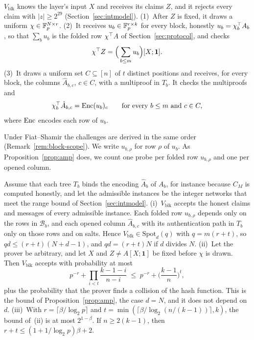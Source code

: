  $V_{\mathrm{blk}}$ knows the layer's input $X$ and receives its claims
$Z$, and it rejects every claim with $|z|\ge2^{29}$ (Section~\ref{sec:intmodel}).
(1)~After $Z$ is fixed, it draws a uniform $\chi\in\mathbb{F}_p^{N\times r}$.
(2)~It receives $u_b\in\mathbb{F}_p^{r\times k}$ for every block, honestly $u_b=\chi_b^\top A_b$, so that
$\sum_bu_b$ is the folded row $\chi^\top A$ of Section~\ref{sec:protocol}, and checks
\begin{equation}
  \chi^\top Z=\Big(\sum_{b\le m}u_b\Big)[X;\mathbf 1].
  \label{eq:block-freivalds}
\end{equation}
(3)~It draws a uniform set $C\subseteq[n]$ of $t$ distinct positions and receives, for every block,
the columns $\hat A_{b,c}$, $c\in C$, with a multiproof in $T_b$. It checks the multiproofs and
\begin{equation}
  \chi_b^\top\hat A_{b,c}=\mathrm{Enc}(u_b)_c\qquad\text{for every }b\le m\text{ and }c\in C,
  \label{eq:block-columns}
\end{equation}
where $\mathrm{Enc}$ encodes each row of $u_b$.

\noindent Under Fiat--Shamir the challenges are derived in the same order
(Remark~\ref{rem:block-scope}). We write $u_{b,\rho}$ for row $\rho$ of $u_b$. As
Proposition~\ref{prop:amp} does, we count one probe per folded row $u_{b,\rho}$ and one per opened
column.

\begin{proposition}
\label{prop:block}
Assume that each tree $T_b$ binds the encoding $\hat A_b$ of $A_b$, for instance because $C_M$ is
computed honestly, and let the admissible instances be the integer networks that meet the range
bound of Section~\ref{sec:intmodel}.
(i)~$V_{\mathrm{blk}}$ accepts the honest claims and messages of every admissible instance. Each
folded row $u_{b,\rho}$ depends only on the rows in $\mathcal B_b$, and each opened column
$\hat A_{b,c}$ with its authentication path in $T_b$ only on those rows and on salts. Hence
$V_{\mathrm{blk}}\in\mathrm{Spot}_d(q)$ with $q=m(r+t)$, so $qd\le(r+t)(N+d-1)$, and $qd=(r+t)N$ if
$d$ divides $N$.
(ii)~Let the prover be arbitrary, and let $X$ and $Z\neq A[X;\mathbf 1]$ be fixed before $\chi$ is
drawn. Then $V_{\mathrm{blk}}$ accepts with probability at most
\[
  p^{-r}+\prod_{i<t}\frac{k-1-i}{n-i}\;\le\;p^{-r}+\Big(\frac{k-1}{n}\Big)^{t},
\]
plus the probability that the prover finds a collision of the hash function. This is the bound of
Proposition~\ref{prop:amp}, the case $d=N$, and it does not depend on $d$.
(iii)~With $r=\lceil\beta/\log_2p\rceil$ and $t=\min(\lceil\beta/\log_2(n/(k-1))\rceil,k)$, the
bound of~(ii) is at most $2^{1-\beta}$. If $n\ge2(k-1)$, then $r+t\le(1+1/\log_2p)\beta+2$.
\end{proposition}

